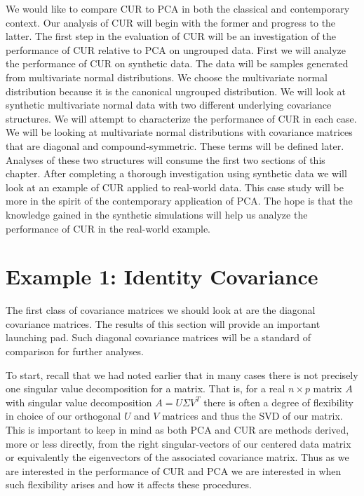 \documentclass{book}
\begin{document}
We would like to compare CUR to PCA in both the classical and contemporary context. Our analysis of CUR will begin with the former and progress to the latter. The first step in the evaluation of CUR will be an investigation of the performance of CUR relative to PCA on ungrouped data. First we will analyze the performance of CUR on synthetic data. The data will be samples generated from multivariate normal distributions. We choose the multivariate normal distribution because it is the canonical ungrouped distribution. We will look at synthetic multivariate normal data with two  different underlying covariance structures. We will attempt to characterize the performance of CUR in each case. We will be looking at multivariate normal distributions with covariance matrices that are diagonal and compound-symmetric. These terms will be defined later. Analyses of these two structures will consume the first two sections of this chapter. After completing a thorough investigation using synthetic data we will look at an example of CUR applied to real-world data. This case study will be more in the spirit of the contemporary application of PCA. The hope is that the knowledge gained in the synthetic simulations will help us analyze the performance of CUR in the real-world example. 

\section{Example 1: Identity Covariance}

The first class of covariance matrices we should look at are the diagonal covariance matrices. The results of this section will provide an important launching pad. Such diagonal covariance matrices will be a standard of comparison for further analyses.

To start, recall that we had noted earlier that in many cases there is not precisely one singular value decomposition for a matrix. That is, for a real $n \times p$ matrix $A$ with singular value decomposition $A=U\Sigma V^T$ there is often a degree of flexibility in choice of our orthogonal $U$ and $V$ matrices and thus the SVD of our matrix. This is important to keep in mind as both PCA and CUR are methods derived, more or less directly, from the right singular-vectors of our centered data matrix or equivalently the eigenvectors of the associated covariance matrix. Thus as we are interested in the performance of CUR and PCA we are interested in when such flexibility arises and how it affects these procedures. 
\end{document}
